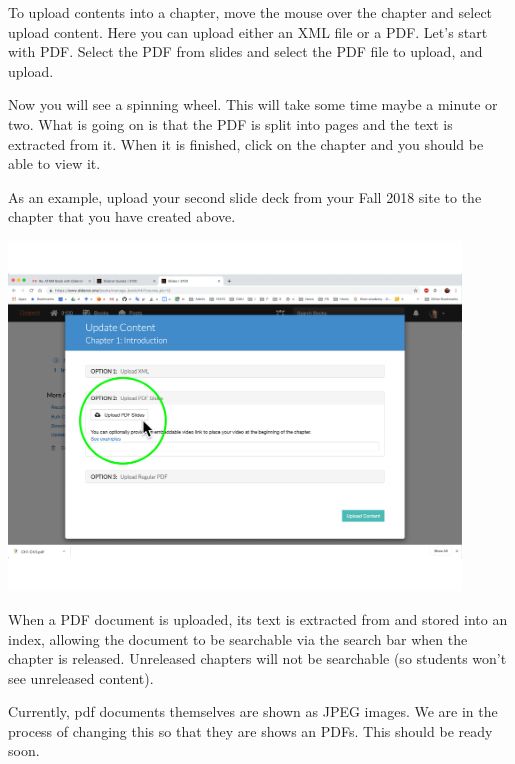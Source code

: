 \begin{gram}
\label{guide:chapter::upload}
To upload contents into a chapter, move the mouse over the chapter and
select upload content.  Here you can upload either an XML
file or a PDF.  Let's start with PDF.  Select the PDF from
slides and select the PDF file to upload, and upload.  

Now you will see a spinning wheel.  This will take some time maybe a
minute or two.  What is going on is that the PDF is split into pages
and the text is extracted from it.  When it is finished, click on the
chapter and you should be able to view it.  

As an example, upload your second slide deck from your Fall 2018 site to the chapter that you have created above.

\includegraphics[width=0.9\textwidth]{author/media/upload-slides.pdf}
\end{gram}

\begin{important}
When a PDF document is uploaded, its text is extracted from and stored into an index, allowing the document to be searchable via the search bar when the chapter is released.
%
Unreleased chapters will not be searchable (so students won't see
unreleased content).
\end{important}

\begin{note}
Currently, pdf documents themselves are shown as JPEG images.  We are in the process of changing this so that they are shows an PDFs.  This should be ready soon.
\end{note}


